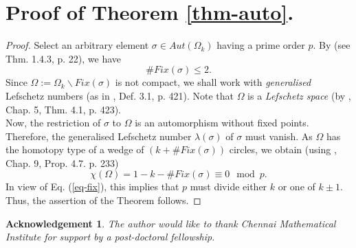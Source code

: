 \documentclass[12pt,a4paper]{article}
\newtheorem*{acknowledgement}{Acknowledgement}
\begin{document}
\section{Proof of Theorem \ref{thm-auto}.}
\begin{proof}
\indent

     Select an arbitrary element $\sigma \in Aut(\Omega_{k})$ having a prime order $p$. By \cite{krantz} (see Thm. 1.4.3, p. 22), we have
    \begin{equation}\label{eq-fix}
     \#Fix(\sigma) \leq 2 .
    \end{equation}
      Since $\Omega :=\Omega_{k}\backslash Fix(\sigma)$ is not compact, we shall work with \textit{generalised} Lefschetz numbers (as in \cite{dugundji}, Def. 3.1, p. 421). Note that $\Omega$ is a \textit{Lefschetz space} (by \cite{dugundji}, Chap. 5, Thm. 4.1, p. 423).\\

      Now, the restriction of $\sigma$ to $\Omega$ is an automorphism without fixed points. Therefore, the generalised Lefschetz number $\lambda(\sigma)$ of $\sigma$ must vanish. As $\Omega$ has the homotopy type of a wedge of $(k+ \#Fix(\sigma))$ circles, we obtain (using \cite{dugundji}, Chap. 9, Prop. 4.7. p. 233)
\begin{equation*}
 \chi(\Omega)=1-k-\#Fix(\sigma)
\equiv 0 \mod p.\end{equation*}
In view of Eq. (\ref{eq-fix}), this implies that $p$ must divide either $k$ or one of $k\pm 1$. Thus, the assertion of the Theorem follows.
\end{proof}
\begin{acknowledgement}
    The author would like to thank Chennai Mathematical Institute for support by a post-doctoral fellowship.
\end{acknowledgement}


\end{document}
